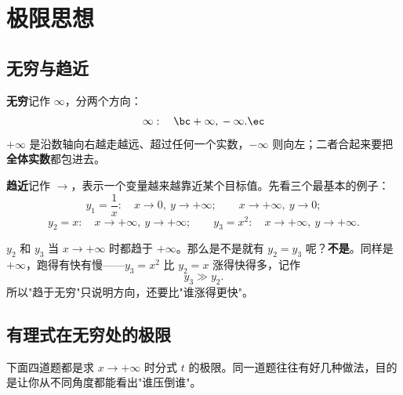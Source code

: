 \chapter{极限思想}

\section{无穷与趋近}

\textbf{无穷}记作 $\infty$，分两个方向：
\[
\infty:\quad
\bc
+\infty,\\
-\infty.
\ec
\]
$+\infty$ 是沿数轴向右越走越远、超过任何一个实数，$-\infty$ 则向左；二者合起来要把\textbf{全体实数}都包进去。

\textbf{趋近}记作 $\to$，表示一个变量越来越靠近某个目标值。先看三个最基本的例子：
\[
y_1=\frac{1}{x}:\quad x\to 0,\ y\to+\infty;\qquad x\to+\infty,\ y\to 0;
\]
\[
y_2=x:\quad x\to+\infty,\ y\to+\infty;\qquad
y_3=x^2:\quad x\to+\infty,\ y\to+\infty.
\]

$y_2$ 和 $y_3$ 当 $x\to+\infty$ 时都趋于 $+\infty$。那么是不是就有 $y_2=y_3$ 呢？\textbf{不是}。同样是 $+\infty$，跑得有快有慢——$y_3=x^2$ 比 $y_2=x$ 涨得快得多，记作
\[
y_3\gg y_2.
\]
所以"趋于无穷"只说明方向，还要比"谁涨得更快"。

\begin{center}
\end{center}

\section{有理式在无穷处的极限}

下面四道题都是求 $x\to+\infty$ 时分式 $t$ 的极限。同一道题往往有好几种做法，目的是让你从不同角度都能看出"谁压倒谁"。



